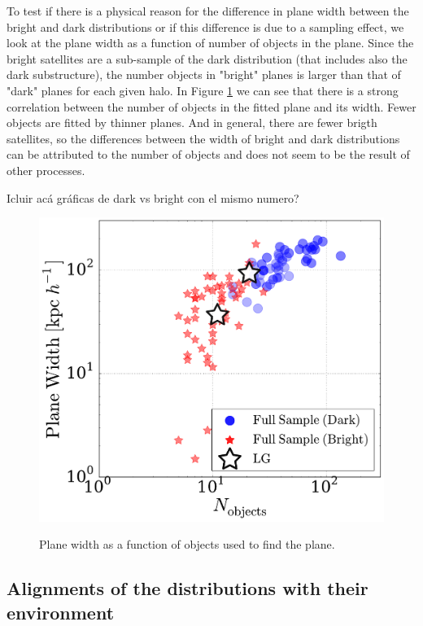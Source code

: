 \documentclass{emulateapj}
\begin{document}
To test if there is a physical reason for the difference in plane width between the bright and dark distributions or if this difference is due to a sampling effect, we look at the plane width as a function of number of objects in the plane. 
Since the bright satellites are a sub-sample of the dark distribution (that includes also the dark substructure), the number objects in "bright" planes is larger than that of "dark" planes for each given halo. 
In Figure \ref{fig:plane_width_nobjects} we can see that there is a strong correlation between the number of objects in the fitted plane and its width. Fewer objects are fitted by thinner planes. And in general, there are fewer brigth satellites, so the differences between the width of bright and dark distributions can be attributed to the number of objects and does not seem to be the result of other processes.

{\color{red} Icluir acá gráficas de dark vs bright con el mismo numero?}

\begin{figure}
\centering
\includegraphics[width=\hsize]{plane_width_n_dark.pdf}\\
\caption{Plane width as a function of objects used to find the plane.}
\label{fig:plane_width_nobjects}
\end{figure}

\subsection{Alignments of the distributions with their environment}
\label{AlignemntH1H2_sats}
\end{document}
